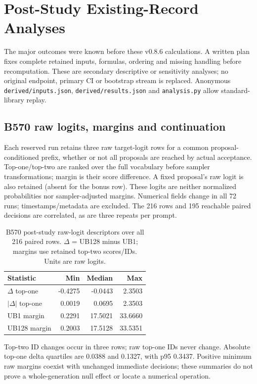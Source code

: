 \section{Post-Study Existing-Record Analyses}
\label{app:derived}
The major outcomes were known before these v0.8.6 calculations. A written plan fixes complete retained inputs, formulas, ordering and missing handling before recomputation. These are secondary descriptive or sensitivity analyses; no original endpoint, primary CI or bootstrap stream is replaced. Anonymous \texttt{derived/inputs.json}, \texttt{derived/results.json} and \texttt{analysis.py} allow standard-library replay.

\subsection{B570 raw logits, margins and continuation}
Each reserved run retains three raw target-logit rows for a common proposal-conditioned prefix, whether or not all proposals are reached by actual acceptance. Top-one/top-two are ranked over the full vocabulary before sampler transformations; margin is their score difference. A fixed proposal's raw logit is also retained (absent for the bonus row). These logits are neither normalized probabilities nor sampler-adjusted margins. Numerical fields change in all 72 runs; timestamps/metadata are excluded. The 216 rows and 195 reachable paired decisions are correlated, as are three repeats per prompt.
\begin{table}[t]
\caption{B570 post-study raw-logit descriptors over all 216 paired rows. $\Delta$ = UB128 minus UB1; margins use retained top-two scores/IDs. Units are raw logits.}
\label{tab:scorederived}
\centering
\begin{tabular}{lrrr}
\toprule
Statistic & Min & Median & Max \\
\midrule
$\Delta$ top-one & -0.4275 & -0.0443 & 2.3503 \\
$|\Delta|$ top-one & 0.0019 & 0.0695 & 2.3503 \\
UB1 margin & 0.2291 & 17.5021 & 33.6660 \\
UB128 margin & 0.2003 & 17.5128 & 33.5351 \\
\bottomrule
\end{tabular}
\end{table}
Top-two ID changes occur in three rows; raw top-one IDs never change. Absolute top-one delta quartiles are 0.0388 and 0.1327, with p95 0.3437. Positive minimum raw margins coexist with unchanged immediate decisions; these summaries do not prove a whole-generation null effect or locate a numerical operation.

